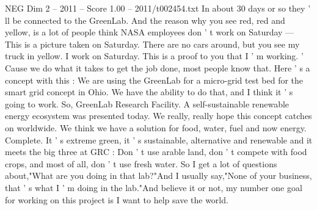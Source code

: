 \begin{textsample}{NEG Dim 2 – 2011 – Score 1.00 – 2011/t002454.txt}
In about 30 days or so they ' ll be connected to the GreenLab.
And the reason why you see red, red and yellow, is a lot of people think NASA employees don ' t work on Saturday — This is a picture taken on Saturday.
There are no cars around, but you see my truck in yellow.
I work on Saturday.
This is a proof to you that I ' m working. ' Cause we do what it takes to get the job done, most people know that.
Here ' s a concept with this : We are using the GreenLab for a micro-grid test bed for the smart grid concept in Ohio.
We have the ability to do that, and I think it ' s going to work.
So, GreenLab Research Facility.
A self-sustainable renewable energy ecosystem was presented today.
We really, really hope this concept catches on worldwide.
We think we have a solution for food, water, fuel and now energy.
Complete.
It ' s extreme green, it ' s sustainable, alternative and renewable and it meets the big three at GRC : Don ' t use arable land, don ' t compete with food crops, and most of all, don ' t use fresh water.
So I get a lot of questions about,"What are you doing in that lab?"And I usually say,"None of your business, that ' s what I ' m doing in the lab."And believe it or not, my number one goal for working on this project is I want to help save the world.

\end{textsample}
